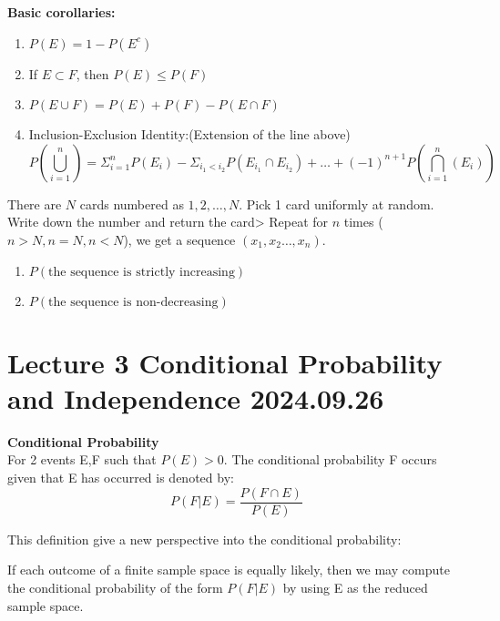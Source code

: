 \documentclass{article}
\begin{document}
\begin{theorem}
    \textbf{Basic corollaries:}\\
    \begin{enumerate}
        \item $P(E) = 1 - P(E^c)$
        \item If $ E \subset F$, then $ P(E) \leq P(F)$
        \item $P(E \cup F) = P(E) + P(F) - P(E \cap F)$
        \item Inclusion-Exclusion Identity:(Extension of the line above)
        $$ P(\bigcup^n_{i=1}) = \Sigma^n_{i=1}P(E_i) - \Sigma_{i_1 < i_2}P(E_{i_1} \cap E_{i_2}) + \dots + (-1)^{n+1}P(\bigcap^n_{i=1}(E_i))$$
    \end{enumerate}
\end{theorem}

\begin{quiz}
    There are $N$ cards numbered as $1,2,\dots, N$. Pick 1 card uniformly at random. Write down the number and return the card> Repeat for $n$ times ($n > N, n = N, n < N$), we get a sequence $(x_1,x_2\dots, x_n)$.
    \begin{enumerate}
        \item $P(\text{the sequence is strictly increasing})$
        \item $P(\text{the sequence is non-decreasing})$
    \end{enumerate}
\end{quiz}



\section{Lecture 3 Conditional Probability and Independence 2024.09.26}
\begin{definition}
    \textbf{Conditional Probability}\\
    For 2 events E,F such that $P(E) > 0$. The conditional probability F occurs given that E has occurred is denoted by:
    $$ P(F|E) = \frac{P(F \cap E)}{P(E)}$$
\end{definition}
This definition give a new perspective into the conditional probability:
\begin{theorem}
    If each outcome of a finite sample space is equally likely, then we may compute the conditional probability of the form $P(F|E)$ by using E as the reduced sample space.
\end{theorem}
\end{document}
